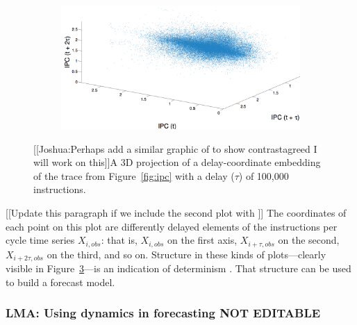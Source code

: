 \begin{figure}
\begin{subfigure}{0.32\textwidth}
    \caption{\svdfive}
    \label{fig:svdfiveEmbedding}
  \end{subfigure}%
  \begin{subfigure}{0.32\textwidth}
    \includegraphics[width=\textwidth]{figs/gcc3dipc.png}
    \caption{\gcc}
    \label{fig:gccEmbedding}
  \end{subfigure}%
 
   
     \caption{[[{\color{red}Joshua:Perhaps add a similar graphic of \gcc to show contrast}{\color{green}agreed I will work on this}]]A 3D projection of a delay-coordinate embedding of the trace
 from Figure~\ref{fig:ipc} with a delay ($\tau$) of 100,000 instructions.
 }
 \label{fig:embedding}
 \end{figure}



[[Update this paragraph if we include the second plot with \gcc]]
The coordinates of each point on this plot are differently delayed
elements of the \col instructions per cycle time series
$X_{i,obs}$: that is, $X_{i,obs}$ on the first axis, $X_{i+\tau,obs}$ on the second,
$X_{i+2\tau,obs}$ on the third, and so on.
Structure in these kinds of plots---clearly visible in
Figure~\ref{fig:embedding}---is an indication of
determinism%
  .  That structure can be used to build a forecast model. 
 \subsubsection{LMA: Using dynamics in forecasting {\color{red} NOT EDITABLE}}

